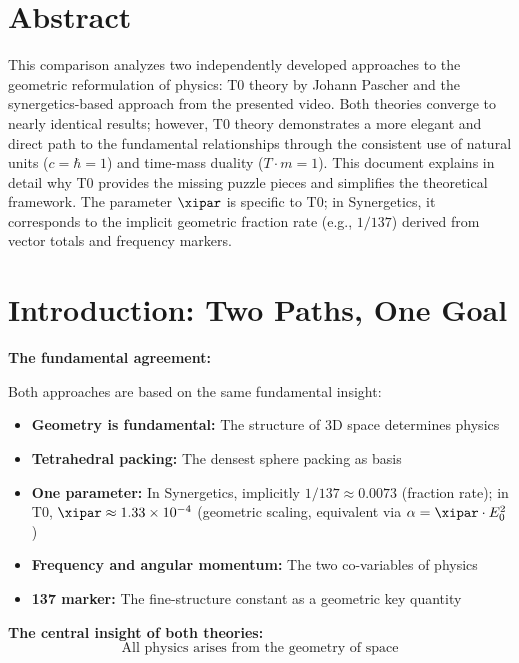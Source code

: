 \section*{Abstract}
		This comparison analyzes two independently developed approaches to the geometric reformulation of physics: T0 theory by Johann Pascher and the synergetics-based approach from the presented video. Both theories converge to nearly identical results; however, T0 theory demonstrates a more elegant and direct path to the fundamental relationships through the consistent use of natural units ($c = \hbar = 1$) and time-mass duality ($T \cdot m = 1$). This document explains in detail why T0 provides the missing puzzle pieces and simplifies the theoretical framework. The parameter $\xipar$ is specific to T0; in Synergetics, it corresponds to the implicit geometric fraction rate (e.g., $1/137$) derived from vector totals and frequency markers.

	
	
	\section{Introduction: Two Paths, One Goal}
	
	\begin{gemeinsam}
		\textbf{The fundamental agreement:}
		
		Both approaches are based on the same fundamental insight:
		\begin{itemize}
			\item \textbf{Geometry is fundamental:} The structure of 3D space determines physics
			\item \textbf{Tetrahedral packing:} The densest sphere packing as basis
			\item \textbf{One parameter:} In Synergetics, implicitly $1/137 \approx 0.0073$ (fraction rate); in T0, $\xipar \approx 1.33 \times 10^{-4}$ (geometric scaling, equivalent via $\alpha = \xipar \cdot E_0^2$)
			\item \textbf{Frequency and angular momentum:} The two co-variables of physics
			\item \textbf{137 marker:} The fine-structure constant as a geometric key quantity
		\end{itemize}
		
		\textbf{The central insight of both theories:}
		\begin{equation}
			\boxed{\text{All physics arises from the geometry of space}}
		\end{equation}
	\end{gemeinsam}
	
